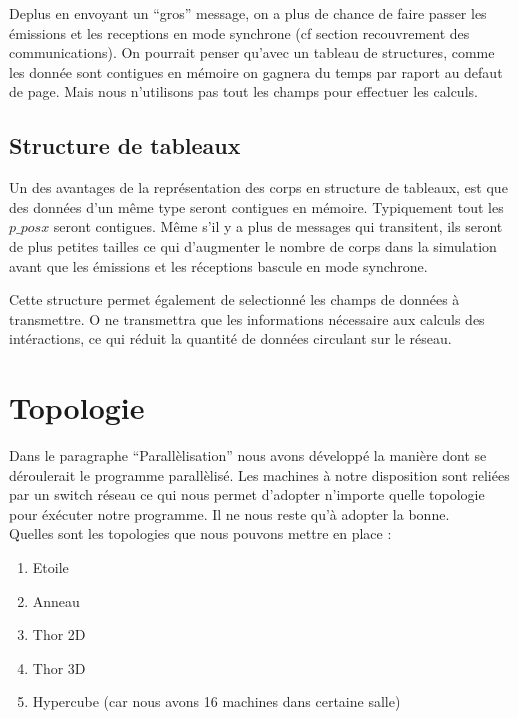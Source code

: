 \par Deplus en envoyant un ``gros'' message, on a plus de chance de faire passer les émissions
et les receptions en mode synchrone (cf section recouvrement des communications). 
On pourrait penser qu'avec un tableau de structures, comme les donnée sont contigues
en mémoire on gagnera du temps par raport au defaut de page. Mais nous n'utilisons pas tout
 les champs pour effectuer les calculs.

\subsection{Structure de tableaux }

\par Un des avantages de la représentation des corps en structure de tableaux, est 
que des données d'un même type seront contigues en mémoire. Typiquement tout les
 $p\_posx$ seront contigues. Même s'il y a plus de messages qui transitent, ils
seront de plus petites tailles ce qui d'augmenter le nombre de corps dans la simulation
avant que les émissions et les réceptions bascule en mode synchrone.\\

\par Cette structure permet également de selectionné les champs de données à transmettre.  
O ne transmettra que les informations nécessaire aux calculs des intéractions, ce qui réduit 
la quantité de données circulant sur le réseau.


\section{Topologie}

\par Dans le paragraphe ``Parallèlisation'' nous avons développé la manière dont se déroulerait 
le programme parallèlisé. Les machines à notre disposition sont reliées par un switch 
réseau ce qui nous permet d'adopter n'importe quelle topologie pour éxécuter notre 
programme. Il ne nous reste qu'à adopter la bonne.\\
Quelles sont les topologies que nous pouvons mettre en place :
\begin{enumerate}
\item Etoile
\item Anneau
\item Thor 2D
\item Thor 3D
\item Hypercube (car nous avons 16 machines dans certaine salle)
\end{enumerate}


